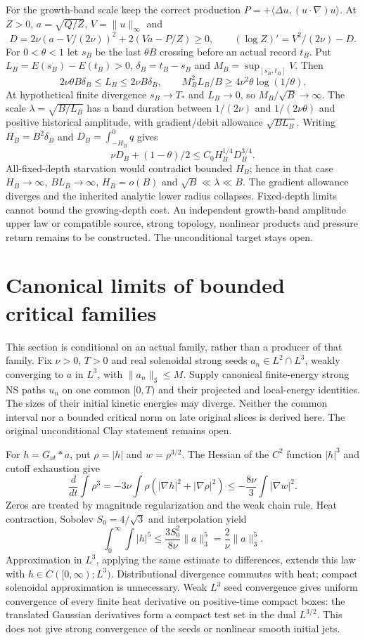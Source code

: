 \documentclass[11pt]{article}
\begin{document}
For the growth-band scale keep the correct production
$P=+\langle\Delta u,(u\cdot\nabla)u\rangle$. At $Z>0$, $a=\sqrt{Q/Z}$,
$V=\|u\|_\infty$ and
\[
 D=2\nu(a-V/(2\nu))^2+2(Va-P/Z)\ge0,
 \qquad(\log Z)'=V^2/(2\nu)-D.
\]
For $0<\theta<1$ let $s_B$ be the last $\theta B$ crossing before an
actual record $t_B$. Put $L_B=E(s_B)-E(t_B)>0$,
$\delta_B=t_B-s_B$ and $M_B=\sup_{[s_B,t_B]}V$. Then
\[
 2\nu\theta B\delta_B\le L_B\le2\nu B\delta_B,
 \qquad M_B^2L_B/B\ge4\nu^2\theta\log(1/\theta).
\]
At hypothetical finite divergence $s_B\to T_*$ and $L_B\to0$, so
$M_B/\sqrt B\to\infty$. The scale $\lambda=\sqrt{B/L_B}$ has a
band duration between $1/(2\nu)$ and $1/(2\nu\theta)$ and positive
historical amplitude, with gradient/debit allowance $\sqrt{BL_B}$.
Writing $H_B=B^2\delta_B$ and $D_B=\int_{-H_B}^0q$ gives
\[
 \nu D_B+(1-\theta)/2\le C_0H_B^{1/4}D_B^{3/4}.
\]
All-fixed-depth starvation would contradict bounded $H_B$; hence in that
case $H_B\to\infty$, $BL_B\to\infty$, $H_B=o(B)$ and
$\sqrt B\ll\lambda\ll B$. The gradient allowance diverges and the
inherited analytic lower radius collapses. Fixed-depth limits cannot
bound the growing-depth cost. An independent growth-band amplitude upper
law or compatible source, strong topology, nonlinear products and pressure
return remains to be constructed. The unconditional target stays open.

\section{Canonical limits of bounded critical families}
\label{sec:critical-family-limit}

This section is conditional on an actual family, rather than a producer of
that family. Fix $\nu>0$, $T>0$ and real solenoidal strong seeds
$a_n\in L^2\cap L^3$, weakly converging to $a$ in $L^3$, with
$\|a_n\|_3\le M$. Supply canonical finite-energy strong NS paths $u_n$
on one common $[0,T)$ and their projected and local-energy identities.
The sizes of their initial kinetic energies may diverge. Neither the
common interval nor a bounded critical norm on late original slices is
derived here. The original unconditional Clay statement remains open.

For $h=G_{\nu t}*a$, put $\rho=|h|$ and $w=\rho^{3/2}$. The Hessian
of the $C^2$ function $|h|^3$ and cutoff exhaustion give
\[
 \frac{d}{dt}\int\rho^3
 =-3\nu\int\rho(|\nabla h|^2+|\nabla\rho|^2)
 \le-\frac{8\nu}{3}\int|\nabla w|^2.
\]
Zeros are treated by magnitude regularization and the weak chain rule.
Heat contraction, Sobolev $S_0=4/\sqrt3$ and interpolation yield
\[
 \int_0^\infty\!\int|h|^5
 \le\frac{3S_0^2}{8\nu}\|a\|_3^5=\frac{2}{\nu}\|a\|_3^5.
\]
Approximation in $L^3$, applying the same estimate to differences,
extends this law with $h\in C([0,\infty);L^3)$. Distributional divergence
commutes with heat; compact solenoidal approximation is unnecessary.
Weak $L^3$ seed convergence gives uniform convergence of every finite
heat derivative on positive-time compact boxes: the translated Gaussian
derivatives form a compact test set in the dual $L^{3/2}$. This does not
give strong convergence of the seeds or nonlinear smooth initial jets.
\end{document}
